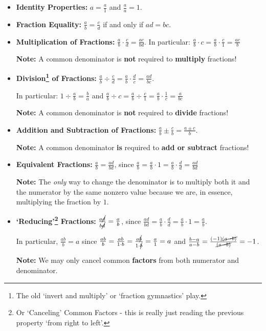 \documentclass{ximera}
\begin{document}
\begin{itemize}

\item  \textbf{Identity Properties:}  $a = \frac{a}{1}$ and $\frac{a}{a} = 1$.

\item  \textbf{Fraction Equality:}  $\frac{a}{b} = \frac{c}{d}$ if and only if $ad = bc$. 

\item  \textbf{Multiplication of Fractions:}  $\frac{a}{b} \cdot \frac{c}{d} = \frac{ac}{bd}$. In particular:  $\frac{a}{b} \cdot c = \frac{a}{b} \cdot \frac{c}{1} = \frac{ac}{b}$

\textbf{Note:}  A common denominator is \textbf{not} required to \textbf{multiply} fractions!

\item  \textbf{Division\footnote{The old `invert and multiply' or `fraction gymnastics' play.} of Fractions:}  $\frac{a}{b} \div \frac{c}{d} = \frac{a}{b} \cdot \frac{d}{c} = \frac{ad}{bc}$. 

In particular: $1 \div \frac{a}{b} = \frac{b}{a}$ and  $\frac{a}{b} \div c = \frac{a}{b} \div \frac{c}{1}  = \frac{a}{b} \cdot \frac{1}{c} = \frac{a}{bc}$

\textbf{Note:}  A common denominator is \textbf{not} required to \textbf{divide} fractions!

\item  \textbf{Addition and Subtraction of Fractions:}  $\frac{a}{b} \pm \frac{c}{b} = \frac{a \pm c}{b}$.  

\textbf{Note:}  A common denominator \textbf{is} required to \textbf{add or subtract} fractions!

\item  \textbf{Equivalent Fractions:}  $\frac{a}{b} = \frac{ad}{bd}$, since $ \frac{a}{b} = \frac{a}{b} \cdot 1 = \frac{a}{b} \cdot \frac{d}{d} = \frac{ad}{bd}$

\textbf{Note:}  The \textit{only} way to change the denominator is to multiply both it and the numerator by the same nonzero value because we are, in essence, multiplying the fraction by $1$.

\item  \textbf{`Reducing'\footnote{Or `Canceling' Common Factors - this is really just reading the previous property `from right to left'.} Fractions:} $\frac{a\cancel{d}}{b\cancel{d}} = \frac{a}{b}$, since  $\frac{ad}{bd} = \frac{a}{b} \cdot \frac{d}{d} = \frac{a}{b} \cdot 1 = \frac{a}{b}$.

In particular, $\frac{ab}{b} = a$ since $\frac{ab}{b} = \frac{ab}{1 \cdot b} =  \frac{a \cancel{b}}{1 \cdot \cancel{b}} = \frac{a}{1} = a$ and $\frac{b-a}{a-b} = \frac{(-1)\cancel{(a-b)}}{\cancel{(a-b)}} = -1$.

\textbf{Note:}  We may only cancel common \textbf{factors} from both numerator and denominator.

\end{itemize}
\end{document}

